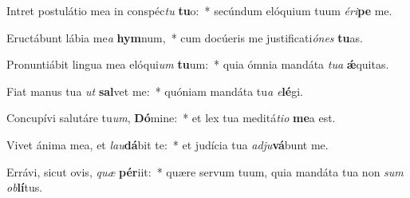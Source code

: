 \item Intret postulátio mea in conspéc\textit{tu} \textbf{tu}o:~* secúndum elóquium tuum \textit{é}\textit{ri}\textbf{pe} me.
\item Eructábunt lábia me\textit{a} \textbf{hym}num,~* cum docúeris me justificati\textit{ó}\textit{nes} \textbf{tu}as.
\item Pronuntiábit lingua mea elóqui\textit{um} \textbf{tu}um:~* quia ómnia mandáta \textit{tu}\textit{a} \textbf{ǽ}quitas.
\item Fiat manus tua \textit{ut} \textbf{sal}vet me:~* quóniam mandáta tu\textit{a} \textit{e}\textbf{lé}gi.
\item Concupívi salutáre tu\textit{um}, \textbf{Dó}mine:~* et lex tua meditá\textit{ti}\textit{o} \textbf{me}a est.
\item Vivet ánima mea, et \textit{lau}\textbf{dá}bit te:~* et judícia tua \textit{ad}\textit{ju}\textbf{vá}bunt me.
\item Errávi, sicut ovis, \textit{quæ} \textbf{pér}iit:~* quære servum tuum, quia mandáta tua non \textit{sum} \textit{ob}\textbf{lí}tus.
